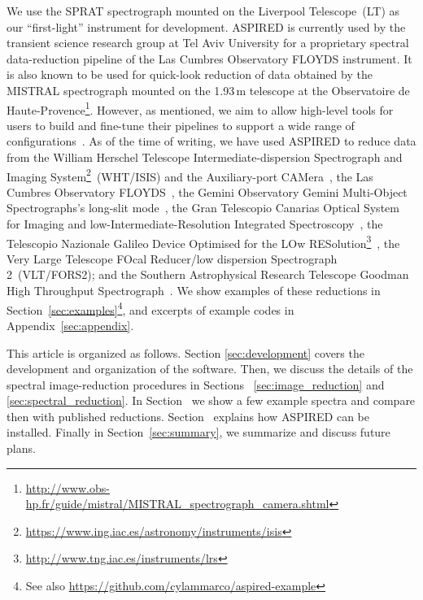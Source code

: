 \documentclass[linenumbers, twocolumn]{aastex631}
\begin{document}
We use the SPRAT spectrograph \citep{2014SPIE.9147E..8HP} mounted on the Liverpool Telescope~(LT) as our
``first-light'' instrument for development. \textsc{ASPIRED} is currently used
by the transient science research group at Tel Aviv University
for a proprietary spectral data-reduction pipeline of the Las Cumbres Observatory
FLOYDS instrument. It is also known to be used
for quick-look reduction of data obtained by the MISTRAL spectrograph
mounted on the 1.93\,m telescope at the Observatoire de
Haute-Provence\footnote{\url{http://www.obs-hp.fr/guide/mistral/MISTRAL_spectrograph_camera.shtml}}.
However, as mentioned, we aim to allow high-level tools for users to build and
fine-tune their pipelines to support a wide range of
configurations~\citep{2022ASPC..532..537L, marco_2021_4463569}. As of the time
of writing, we have used \textsc{ASPIRED} to reduce data from the
William Herschel Telescope Intermediate-dispersion Spectrograph and
Imaging System\footnote{\url{https://www.ing.iac.es/astronomy/instruments/isis}}~(WHT/ISIS)
and the Auxiliary-port CAMera~\citep[ACAM;][]{2008SPIE.7014E..6XB}, the Las Cumbres
Observatory FLOYDS~\citep[Las Cumbres/FLOYDS;][]{2013PASP..125.1031B}, the Gemini Observatory
Gemini Multi-Object Spectrographs's long-slit
mode~\citep[Gemini/GMOS-LS;][]{2004PASP..116..425H}, the Gran Telescopio Canarias
Optical System for Imaging and low-Intermediate-Resolution Integrated
Spectroscopy~\citep[GTC/OSIRIS;][]{2000SPIE.4008..623C}, the Telescopio
Nazionale Galileo Device Optimised for the LOw
RESolution\footnote{\url{http://www.tng.iac.es/instruments/lrs}}~\citep[TNG/DOLORES;][]{1999ldss.work..157M},
the Very Large Telescope FOcal Reducer/low dispersion Spectrograph 2~(VLT/FORS2); and the Southern Astrophysical Research Telescope Goodman High Throughput Spectrograph~\citep[SOAR/GHTS][]{2004SPIE.5492..331C}.
We show examples of these reductions in Section~\ref{sec:examples}\footnote{See
also \url{https://github.com/cylammarco/aspired-example}}, and excerpts of
example codes in Appendix~\ref{sec:appendix}.

This article is organized as follows. Section \textsection\ref{sec:development}
covers the development and organization of the software. Then, we discuss the
details of the spectral image-reduction procedures in Sections~\textsection
\ref{sec:image_reduction} and \ref{sec:spectral_reduction}. In
Section~\textsection{\ref{sec:examples}} we show a few example spectra and
compare then with published reductions.
Section~\textsection{\ref{sec:distribution}}
explains how \textsc{ASPIRED} can be installed. Finally in 
Section~\textsection\ref{sec:summary}, we summarize and discuss future
plans.
\end{document}
